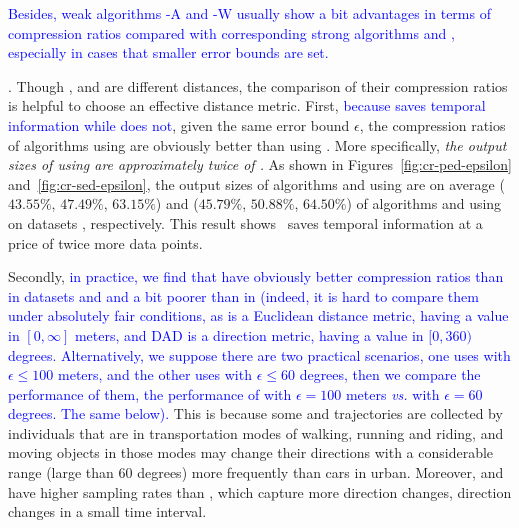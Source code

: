 \textcolor{blue}{Besides, weak algorithms \operb-A and \cised-W usually show a bit advantages in terms of compression ratios compared with corresponding strong algorithms \operb and \cised, especially in cases that smaller error bounds are set.}




.
Though \ped, \sed and \dad are different distances, the comparison of their compression ratios is helpful to choose an effective distance metric.
%
First, \textcolor{blue}{because \sed saves temporal information while \ped does not}, given the same error bound $\epsilon$, the compression ratios of algorithms using \ped are obviously better
than using \sed. More specifically, \emph{the output sizes of using \sed are approximately twice of \ped.}
%
As shown in Figures~\ref{fig:cr-ped-epsilon} and~\ref{fig:cr-sed-epsilon}, the output sizes of algorithms \tpa and \dpa
using \ped are on average ($43.55\%$, $47.49\%$, $63.15\%$) and ($45.79\%$,
$50.88\%$, $64.50\%$) of algorithms \tpa and \dpa using \sed on datasets \dSets, respectively.
%
%
This result shows ~\sed saves temporal information at a price of twice more data points.


Secondly, \textcolor{blue}{in practice, we find that \sed have obviously better compression ratios than \dad in datasets \geolife and \mopsi and a bit poorer than \dad in \ucar (indeed, it is hard to compare them under absolutely fair conditions, as \sed is a Euclidean distance metric, having a value in $[0, \infty]$ meters, and DAD is a direction metric,  having a value in $[0,360)$ degrees. Alternatively, we suppose there are two practical scenarios, one uses \sed with $\epsilon  \le  100$ meters, and the other uses \dad with $\epsilon \le 60$ degrees, then we compare the performance of them, \eg the performance of \sed with $\epsilon=100$ meters \emph{vs.} \dad with $\epsilon=60$ degrees. The same below).}
This is because some \geolife and \mopsi trajectories are collected by individuals that are in transportation modes of walking, running and riding, and moving objects in those modes may change their directions with a considerable range (\eg large than $60$ degrees) more frequently than cars in urban. Moreover, \geolife and \mopsi have higher sampling rates than \ucar, which capture more direction changes, \ie direction changes in a small time interval.

